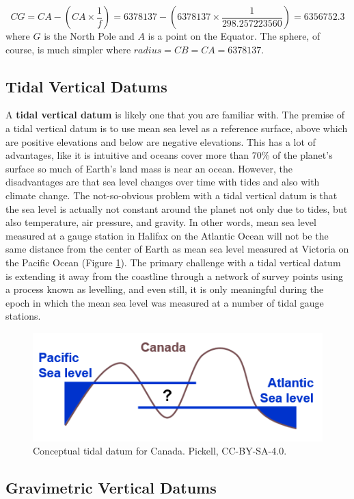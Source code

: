 \documentclass[
]{book}
\begin{document}
\[
CG=CA-(CA×\frac{1}{f})=6378137-(6378137×\frac{1}{298.257223560})=6356752.3
\]
where \(G\) is the North Pole and \(A\) is a point on the Equator. The sphere, of course, is much simpler where \(radius=CB=CA=6378137\).

\hypertarget{tidal-vertical-datums}{%
\subsection{Tidal Vertical Datums}\label{tidal-vertical-datums}}

A \textbf{tidal vertical datum} is likely one that you are familiar with. The premise of a tidal vertical datum is to use mean sea level as a reference surface, above which are positive elevations and below are negative elevations. This has a lot of advantages, like it is intuitive and oceans cover more than 70\% of the planet's surface so much of Earth's land mass is near an ocean. However, the disadvantages are that sea level changes over time with tides and also with climate change. The not-so-obvious problem with a tidal vertical datum is that the sea level is actually not constant around the planet not only due to tides, but also temperature, air pressure, and gravity. In other words, mean sea level measured at a gauge station in Halifax on the Atlantic Ocean will not be the same distance from the center of Earth as mean sea level measured at Victoria on the Pacific Ocean (Figure \ref{fig:2-tidal-datum}). The primary challenge with a tidal vertical datum is extending it away from the coastline through a network of survey points using a process known as levelling, and even still, it is only meaningful during the epoch in which the mean sea level was measured at a number of tidal gauge stations.

\begin{figure}
\includegraphics[width=0.75\linewidth]{images/02-tidal-datum} \caption{Conceptual tidal datum for Canada. Pickell, CC-BY-SA-4.0.}\label{fig:2-tidal-datum}
\end{figure}

\hypertarget{gravimetric-vertical-datums}{%
\subsection{Gravimetric Vertical Datums}\label{gravimetric-vertical-datums}}
\end{document}
